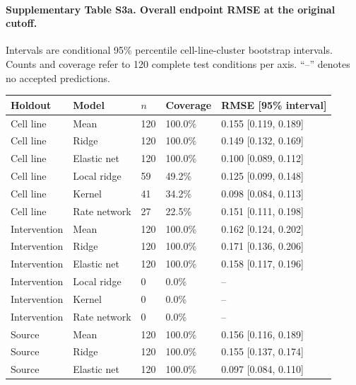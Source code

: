\documentclass[a4paper,fleqn]{cas-sc}
\makeatletter
\DeclareRobustCommand{\rev}[1]{{\color{red}\def\@citecolor{black}\def\@linkcolor{red}\def\@urlcolor{red}#1}}
\makeatother
\begin{document}
\paragraph{Supplementary Table S3a. Overall endpoint RMSE at the original cutoff.}
Intervals are conditional 95\% percentile cell-line-cluster bootstrap intervals. Counts and coverage refer to 120 complete test conditions per axis. ``--'' denotes no accepted predictions.
\small
\begin{longtable}{p{}p{}p{}p{}p{}}
\toprule
\rev{Holdout} & \rev{Model} & \rev{$n$} & \rev{Coverage} & \rev{RMSE [95\% interval]}\\
\midrule
\endhead
\rev{Cell line} & \rev{Mean} & \rev{120} & \rev{100.0\%} & \rev{0.155 [0.119, 0.189]}\\
\rev{Cell line} & \rev{Ridge} & \rev{120} & \rev{100.0\%} & \rev{0.149 [0.132, 0.169]}\\
\rev{Cell line} & \rev{Elastic net} & \rev{120} & \rev{100.0\%} & \rev{0.100 [0.089, 0.112]}\\
\rev{Cell line} & \rev{Local ridge} & \rev{59} & \rev{49.2\%} & \rev{0.125 [0.099, 0.148]}\\
\rev{Cell line} & \rev{Kernel} & \rev{41} & \rev{34.2\%} & \rev{0.098 [0.084, 0.113]}\\
\rev{Cell line} & \rev{Rate network} & \rev{27} & \rev{22.5\%} & \rev{0.151 [0.111, 0.198]}\\
\rev{Intervention} & \rev{Mean} & \rev{120} & \rev{100.0\%} & \rev{0.162 [0.124, 0.202]}\\
\rev{Intervention} & \rev{Ridge} & \rev{120} & \rev{100.0\%} & \rev{0.171 [0.136, 0.206]}\\
\rev{Intervention} & \rev{Elastic net} & \rev{120} & \rev{100.0\%} & \rev{0.158 [0.117, 0.196]}\\
\rev{Intervention} & \rev{Local ridge} & \rev{0} & \rev{0.0\%} & \rev{--}\\
\rev{Intervention} & \rev{Kernel} & \rev{0} & \rev{0.0\%} & \rev{--}\\
\rev{Intervention} & \rev{Rate network} & \rev{0} & \rev{0.0\%} & \rev{--}\\
\rev{Source} & \rev{Mean} & \rev{120} & \rev{100.0\%} & \rev{0.156 [0.116, 0.189]}\\
\rev{Source} & \rev{Ridge} & \rev{120} & \rev{100.0\%} & \rev{0.155 [0.137, 0.174]}\\
\rev{Source} & \rev{Elastic net} & \rev{120} & \rev{100.0\%} & \rev{0.097 [0.084, 0.110]}\\

\end{longtable}
\end{document}

